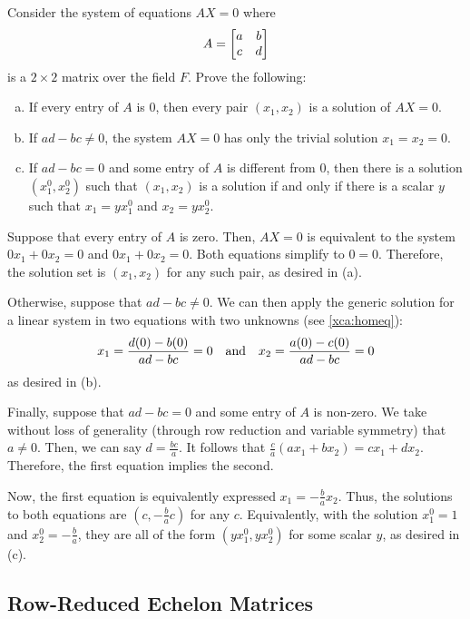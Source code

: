 \begin{xca}
  Consider the system of equations $AX = 0$ where \[ A = \begin{bmatrix}a&b \\ c&d\end{bmatrix} \]
  is a $2 \times 2$ matrix over the field $F$. Prove the following:
  \setlength\parskip{0pt}
  \begin{enumerate}[(a)]
    \item If every entry of $A$ is 0, then every pair $(x_1, x_2)$ is a solution of $AX = 0$.
    \item If $ad-bc \neq 0$, the system $AX = 0$ has only the trivial solution $x_1 = x_2 = 0$.
    \item If $ad-bc = 0$ and some entry of $A$ is different from 0,
          then there is a solution $(x_1^0, x_2^0)$ such that
          $(x_1, x_2)$ is a solution if and only if there is a scalar $y$ such that
          $x_1 = yx_1^0$ and $x_2 = yx_2^0$.
  \end{enumerate}
\end{xca}
\begin{prf}
  Suppose that every entry of $A$ is zero.
  Then, $AX = 0$ is equivalent to the system $0x_1 + 0x_2 = 0$ and $0x_1 + 0x_2 = 0$.
  Both equations simplify to $0 = 0$.
  Therefore, the solution set is $(x_1, x_2)$ for any such pair, as desired in (a).

  Otherwise, suppose that $ad - bc \neq 0$.
  We can then apply the generic solution for a linear system in two equations with two unknowns
  (see \cref{xca:homeq}):
  \[ x_1 = \frac{d(0) - b(0)}{ad - bc} = 0 \qq{and} x_2 = \frac{a(0) - c(0)}{ad - bc} = 0 \]
  as desired in (b).

  Finally, suppose that $ad - bc = 0$ and some entry of $A$ is non-zero.
  We take without loss of generality (through row reduction and variable symmetry) that $a \neq 0$.
  Then, we can say $d = \frac{bc}{a}$.
  It follows that $\frac{c}{a}(ax_1 + bx_2) = cx_1 + dx_2$.
  Therefore, the first equation implies the second.

  Now, the first equation is equivalently expressed $x_1 = -\frac{b}{a}x_2$.
  Thus, the solutions to both equations are $(c, -\frac{b}{a}c)$ for any $c$.
  Equivalently, with the solution $x_1^0 = 1$ and $x_2^0 = -\frac{b}{a}$,
  they are all of the form $(yx_1^0, yx_2^0)$ for some scalar $y$, as desired in (c).
\end{prf}

\subsection{Row-Reduced Echelon Matrices}

